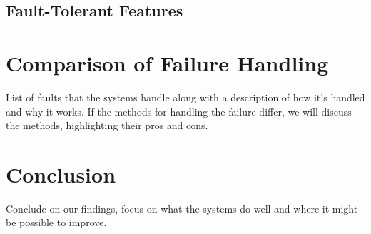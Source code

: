 \documentclass[11pt]{report}
\begin{document}
\section{Fault-Tolerant Features}

\chapter{Comparison of Failure Handling}
List of faults that the systems handle along with a description of how it's handled and why it works. If the methods for handling the failure differ, we will discuss the methods, highlighting their pros and cons.

\chapter{Conclusion}
Conclude on our findings, focus on what the systems do well and where it might be possible to improve.
\end{document}
